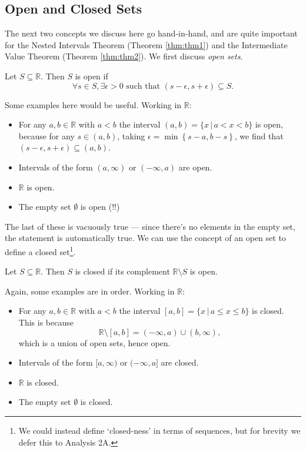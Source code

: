 \documentclass[
  12pt,
  a4paper]{extarticle}
\providecommand{\tightlist}{%
  \setlength{\itemsep}{0pt}\setlength{\parskip}{0pt}}
\theoremstyle{plain}
\theoremstyle{plain}
\theoremstyle{plain}
\theoremstyle{plain}
\theoremstyle{plain}
\theoremstyle{definition}
\theoremstyle{definition}
\theoremstyle{definition}
\theoremstyle{remark}
\let\BeginKnitrBlock\begin \let\EndKnitrBlock\end
\renewcommand{\;}{\,}
\begin{document}
\hypertarget{open-and-closed-sets}{%
\subsection{Open and Closed Sets}\label{open-and-closed-sets}}

The next two concepts we discuss here go hand-in-hand, and are quite important for the Nested Intervals Theorem (Theorem \ref{thm:thm1}) and the Intermediate Value Theorem (Theorem \ref{thm:thm2}). We first discuss \emph{open sets}.

\BeginKnitrBlock{definition}[Open Set]
{\label{def:def4} }Let \(S \subseteq \mathbb{R}\). Then \(S\) is open if \[\forall s \in S, \exists \epsilon > 0 \;\; \text{such that} \;\; (s-\epsilon,s+\epsilon) \subseteq S.\]
\EndKnitrBlock{definition}
Some examples here would be useful. Working in \(\mathbb{R}\):

\begin{itemize}
\tightlist
\item
  For any \(a,b \in \mathbb{R}\) with \(a < b\) the interval \((a,b) = \lbrace x \;\lvert\; a < x < b \rbrace\) is open, because for any \(s \in (a,b)\), taking \(\epsilon = \min\left\lbrace s-a, b-s\right\rbrace\), we find that \((s-\epsilon, s + \epsilon) \subseteq (a,b)\).
\item
  Intervals of the form \((a, \infty)\) or \((-\infty, a)\) are open.
\item
  \(\mathbb{R}\) is open.
\item
  The empty set \(\emptyset\) is open (!!)
\end{itemize}

The last of these is vacuously true --- since there's no elements in the empty set, the statement is automatically true. We can use the concept of an open set to define a closed set\footnote{We could instead define `closed-ness' in terms of sequences, but for brevity we defer this to Analysis 2A.}.

\BeginKnitrBlock{definition}[Closed Set]
{\label{def:def5} }Let \(S \subseteq \mathbb{R}\). Then \(S\) is closed if its complement \(\mathbb{R}\setminus S\) is open.
\EndKnitrBlock{definition}
Again, some examples are in order. Working in \(\mathbb{R}\):

\begin{itemize}
\tightlist
\item
  For any \(a,b \in \mathbb{R}\) with \(a < b\) the interval \([a,b] = \lbrace x \;\lvert\; a \leq x \leq b \rbrace\) is closed. This is because \[\mathbb{R}\setminus[a,b] = (-\infty,a)\cup(b,\infty),\] which is a union of open sets, hence open.
\item
  Intervals of the form \([a, \infty)\) or \((-\infty, a]\) are closed.
\item
  \(\mathbb{R}\) is closed.
\item
  The empty set \(\emptyset\) is closed.
\end{itemize}
\end{document}
